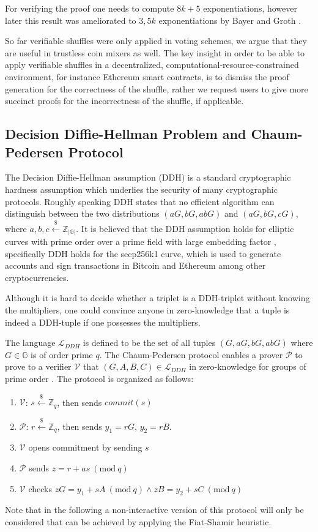 \documentclass[a4paper,UKenglish,cleveref, autoref]{oasics-v2019}
\newcommand{\Mod}[1]{\ (\mathrm{mod}\ #1)}
\begin{document}
For verifying the proof one needs to compute $8k+5$ exponentiations, however later this result was ameliorated to $3,5k$ exponentiations by Bayer and Groth \cite{bayer2012efficient}.

So far verifiable shuffles were only applied in voting schemes, we argue that they are useful in trustless coin mixers as well. The key insight in order to be able to apply verifiable shuffles in a decentralized, computational-resource-constrained environment, for instance Ethereum smart contracts, is to dismiss the proof generation for the correctness of the shuffle, rather we request users to give more succinct proofs for the incorrectness of the shuffle, if applicable.   

\subsection{Decision Diffie-Hellman Problem and Chaum-Pedersen Protocol}

The Decision Diffie-Hellman assumption (DDH) is a standard cryptographic hardness assumption which underlies the security of many cryptographic protocols. Roughly speaking DDH states that no efficient algorithm can distinguish between the two distributions $(aG, bG, abG)$ and $(aG, bG, cG)$, where $a,b,c\stackrel{\$}{\leftarrow}\mathbb{Z}_{|\mathbb{G}|}$. It is believed that the DDH assumption holds for elliptic curves with prime order over a prime field with large embedding factor \cite{boneh1998decision}, specifically DDH holds for the secp256k1 curve, which is used to generate accounts and sign transactions in Bitcoin and Ethereum among other cryptocurrencies. 

Although it is hard to decide whether a triplet is a DDH-triplet without knowing the multipliers, one could convince anyone in zero-knowledge that a tuple is indeed a DDH-tuple if one possesses the multipliers.    

The language $\mathcal{L}_{DDH}$ is defined to be the set of all tuples $(G,aG,bG,abG)$ where $G\in \mathbb{G}$ is of order prime $q$. The Chaum-Pedersen protocol enables a prover $\mathcal{P}$ to prove to a verifier $\mathcal{V}$ that $(G,A,B,C)\in\mathcal{L}_{DDH}$ in zero-knowledge for groups of prime order \cite{chaum1992wallet}. The protocol is organized as follows:

\begin{enumerate}
	\item $\mathcal{V}$: $s\stackrel{\$}{\leftarrow}\mathbb{Z}_q$, then sends $commit(s)$ 
	\item $\mathcal{P}$: $r\stackrel{\$}{\leftarrow}\mathbb{Z}_q$, then sends $y_1=rG$, $y_2=rB$.
	\item $\mathcal{V}$ opens commitment by sending $s$
	\item $\mathcal{P}$ sends $z=r+as \Mod{q}$
	\item $\mathcal{V}$ checks $zG=y_{1}+sA \Mod{q} \land zB=y_{2}+sC \Mod{q}$
\end{enumerate} 
Note that in the following a non-interactive version of this protocol will only be considered that can be achieved by applying the Fiat-Shamir heuristic. 
\end{document}
